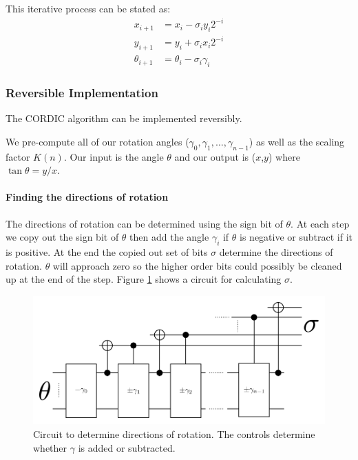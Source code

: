         This iterative process can be stated as:
        \begin{equation}\label{eq:cordIter}
            \begin{aligned}
                x_{i+1}      &= x_i - \sigma_iy_i2^{-i}\\
                y_{i+1}      &= y_i + \sigma_ix_i2^{-i}\\
                \theta_{i+1} &= \theta_i - \sigma_i\gamma_i
            \end{aligned}
        \end{equation}

    \subsubsection{Reversible Implementation}
        The CORDIC algorithm can be implemented reversibly.

	We pre-compute all of our rotation angles
	($\gamma_0,\gamma_1,\dotsc,\gamma_{n-1}$) as well as the scaling factor
	$K(n)$. Our input is the angle $\theta$ and our output is ($x$,$y$)
	where $\tan\theta = y/x$.

        \paragraph{Finding the directions of rotation}
            The directions of rotation can be determined using the sign bit of $\theta$.
            At each step we copy out the sign bit of $\theta$ then add the angle $\gamma_i$ if $\theta$ is negative or subtract if it is positive.
            At the end the copied out set of bits $\sigma$ determine the directions of rotation.
            $\theta$ will approach zero so the higher order bits could possibly be cleaned up at the end of the step.
            Figure \ref{fig:CORDICDirections} shows a circuit for calculating $\sigma$.
            \begin{figure}
                \capstart
                \centering
                \includegraphics[width=\textwidth]{images/CORDICDirections}
                \caption{Circuit to determine directions of rotation.  The controls determine whether $\gamma$ is added or subtracted.}
                \label{fig:CORDICDirections}
            \end{figure}

